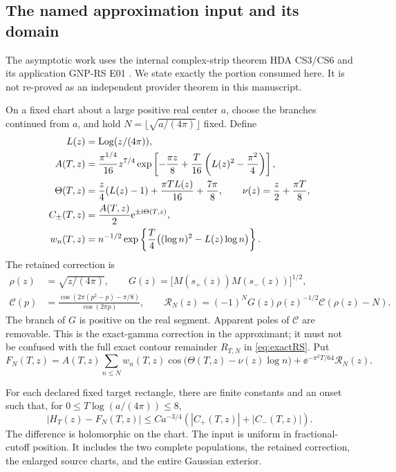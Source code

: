\subsection{The named approximation input and its domain}

The asymptotic work uses the internal complex-strip theorem HDA CS3/CS6
and its application GNP-RS E01 \cite{hda,gnpe01}.
We state exactly the portion consumed here. It is not re-proved as an
independent provider theorem in this manuscript.

On a fixed chart about a large positive real center \(a\), choose the
branches continued from \(a\), and hold
\(N=\lfloor\sqrt{a/(4\pi)}\rfloor\) fixed. Define
\begin{align}
 L(z)&=\operatorname{Log}(z/(4\pi)),\\
 A(T,z)&=\frac{\pi^{1/4}}{16}z^{7/4}
   \exp\left[-\frac{\pi z}{8}
       +\frac T{16}\left(L(z)^2-\frac{\pi^2}{4}\right)\right],
       \label{eq:carrier}\\
 \Theta(T,z)&=\frac z4(L(z)-1)+\frac{\pi T L(z)}{16}
                         +\frac{7\pi}{8},\qquad
 \nu(z)=\frac z2+\frac{\pi T}{8},\\
 C_\pm(T,z)&=\frac{A(T,z)}2\mathrm e^{\pm\mathrm i\Theta(T,z)},\\
 w_n(T,z)&=n^{-1/2}
  \exp\left\{\frac T4\bigl((\log n)^2-L(z)\log n\bigr)\right\}.
\end{align}
The retained correction is
\begin{align}
 \rho(z)&=\sqrt{z/(4\pi)},\qquad
 G(z)=\bigl[M(s_+(z))M(s_-(z))\bigr]^{1/2},\\
 \mathcal C(p)&=\frac{\cos(2\pi(p^2-p)-\pi/8)}{\cos(2\pi p)},\qquad
 \mathcal R_N(z)=(-1)^N G(z)\rho(z)^{-1/2}\mathcal C(\rho(z)-N).
 \label{eq:Rcorrection}
\end{align}
The branch of \(G\) is positive on the real segment. Apparent poles of
\(\mathcal C\) are removable. This is the exact-gamma correction in the
approximant; it must not be confused with the full exact contour
remainder \(R_{T,N}\) in \eqref{eq:exactRS}.
Put
\begin{equation}\label{eq:FN}
 F_N(T,z)=A(T,z)\sum_{n\le N}w_n(T,z)
       \cos\bigl(\Theta(T,z)-\nu(z)\log n\bigr)
       +\ee^{-\pi^2T/64}\mathcal R_N(z).
\end{equation}

\begin{inputthm}\label{input:provider}
For each declared fixed target rectangle, there are finite constants and
an onset such that, for \(0\le T\log(a/(4\pi))\le8\),
\begin{equation}\label{eq:provider}
 |H_T(z)-F_N(T,z)|\le C a^{-3/4}(|C_+(T,z)|+|C_-(T,z)|).
\end{equation}
The difference is holomorphic on the chart. The input is uniform in
fractional-cutoff position. It includes the two complete populations,
the retained correction, the enlarged source charts, and the entire
Gaussian exterior.
\end{inputthm}

